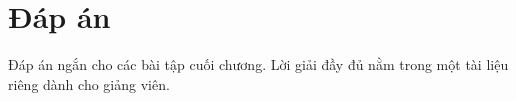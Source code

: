 \chapter{Đáp án}
\label{sec:answers}

Đáp án ngắn cho các bài tập cuối chương. Lời giải đầy đủ nằm trong một tài liệu riêng dành cho giảng viên.























